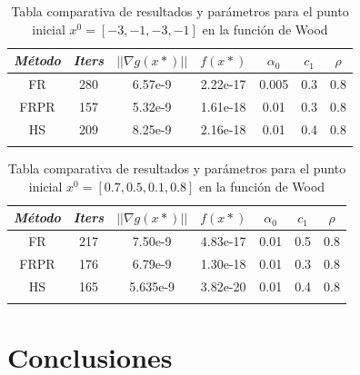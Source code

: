 \documentclass[conference]{IEEEtran}
\begin{document}
\begin{table}[htbp]
    \caption{Tabla comparativa de resultados y parámetros para el punto inicial $x^0 = [-3, -1, -3, -1]$ en la función de Wood}
    \begin{center}
        \begin{tabular}{|c|c|c|c|c|c|c|}
            \hline
			\textbf{\textit{Método}}& \textbf{\textit{Iters}}& \textbf{\textit{$||\nabla g(x*)||$}}& \textbf{\textit{$f(x*)$}}& \textbf{\textit{$\alpha_0$}}& \textbf{\textit{$c_1$}}& \textbf{\textit{$\rho$}} \\
            \hline
            FR   & 280 & 6.57e-9 & 2.22e-17 & 0.005 & 0.3 & 0.8 \\
            FRPR & 157 & 5.32e-9 & 1.61e-18 & 0.01 & 0.3 & 0.8 \\
            HS   & 209 & 8.25e-9 & 2.16e-18 & 0.01 & 0.4 & 0.8 \\
            \hline
            \multicolumn{4}{l}{}
        \end{tabular}
        \label{tab3}
    \end{center}
\end{table}

\begin{table}[htbp]
    \caption{Tabla comparativa de resultados y parámetros para el punto inicial $x^0 = [0.7, 0.5, 0.1, 0.8]$ en la función de Wood}
    \begin{center}
        \begin{tabular}{|c|c|c|c|c|c|c|}
            \hline
			\textbf{\textit{Método}}& \textbf{\textit{Iters}}& \textbf{\textit{$||\nabla g(x*)||$}}& \textbf{\textit{$f(x*)$}}& \textbf{\textit{$\alpha_0$}}& \textbf{\textit{$c_1$}}& \textbf{\textit{$\rho$}} \\
            \hline
            FR   & 217 & 7.50e-9 & 4.83e-17 & 0.01 & 0.5 & 0.8 \\
            FRPR & 176 & 6.79e-9 & 1.30e-18 & 0.01 & 0.3 & 0.8 \\
            HS   & 165 & 5.635e-9 & 3.82e-20 & 0.01 & 0.4 & 0.8 \\
            \hline
            \multicolumn{4}{l}{}
        \end{tabular}
        \label{tab4}
    \end{center}
\end{table}

\section{Conclusiones}
\end{document}
